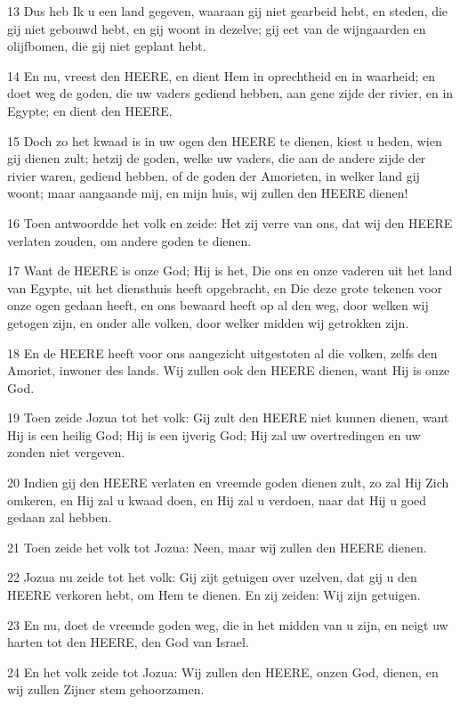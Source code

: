 \par 13 Dus heb Ik u een land gegeven, waaraan gij niet gearbeid hebt, en steden, die gij niet gebouwd hebt, en gij woont in dezelve; gij eet van de wijngaarden en olijfbomen, die gij niet geplant hebt.
\par 14 En nu, vreest den HEERE, en dient Hem in oprechtheid en in waarheid; en doet weg de goden, die uw vaders gediend hebben, aan gene zijde der rivier, en in Egypte; en dient den HEERE.
\par 15 Doch zo het kwaad is in uw ogen den HEERE te dienen, kiest u heden, wien gij dienen zult; hetzij de goden, welke uw vaders, die aan de andere zijde der rivier waren, gediend hebben, of de goden der Amorieten, in welker land gij woont; maar aangaande mij, en mijn huis, wij zullen den HEERE dienen!
\par 16 Toen antwoordde het volk en zeide: Het zij verre van ons, dat wij den HEERE verlaten zouden, om andere goden te dienen.
\par 17 Want de HEERE is onze God; Hij is het, Die ons en onze vaderen uit het land van Egypte, uit het diensthuis heeft opgebracht, en Die deze grote tekenen voor onze ogen gedaan heeft, en ons bewaard heeft op al den weg, door welken wij getogen zijn, en onder alle volken, door welker midden wij getrokken zijn.
\par 18 En de HEERE heeft voor ons aangezicht uitgestoten al die volken, zelfs den Amoriet, inwoner des lands. Wij zullen ook den HEERE dienen, want Hij is onze God.
\par 19 Toen zeide Jozua tot het volk: Gij zult den HEERE niet kunnen dienen, want Hij is een heilig God; Hij is een ijverig God; Hij zal uw overtredingen en uw zonden niet vergeven.
\par 20 Indien gij den HEERE verlaten en vreemde goden dienen zult, zo zal Hij Zich omkeren, en Hij zal u kwaad doen, en Hij zal u verdoen, naar dat Hij u goed gedaan zal hebben.
\par 21 Toen zeide het volk tot Jozua: Neen, maar wij zullen den HEERE dienen.
\par 22 Jozua nu zeide tot het volk: Gij zijt getuigen over uzelven, dat gij u den HEERE verkoren hebt, om Hem te dienen. En zij zeiden: Wij zijn getuigen.
\par 23 En nu, doet de vreemde goden weg, die in het midden van u zijn, en neigt uw harten tot den HEERE, den God van Israel.
\par 24 En het volk zeide tot Jozua: Wij zullen den HEERE, onzen God, dienen, en wij zullen Zijner stem gehoorzamen.
